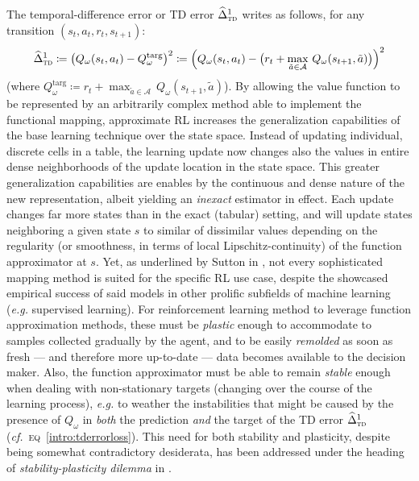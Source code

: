 The temporal-difference error or TD error $\widehat{\Delta}_\textsc{td}^1$
writes as follows, for any transition $(s_t,a_t,r_t,s_{t+1})$:
\begin{align}
\widehat{\Delta}_\textsc{td}^1
\coloneqq
\big(
Q_\omega(s_t,a_t) - Q_\omega^\text{targ}
\big)^2
\coloneqq
\Big(
Q_\omega(s_t,a_t) - \big(r_t + \max_{\tilde{a} \in \mathcal{A}} \, Q_\omega(s_{t+1},\tilde{a})\big)
\Big)^2
\label{intro:tderrorloss}
\end{align}
\big(where
$Q_\omega^\text{targ} \coloneqq r_t + \max_{\tilde{a} \in \mathcal{A}} \, Q_\omega(s_{t+1},\tilde{a})$\big).
By allowing the value function to be represented by an arbitrarily complex method able to implement the
functional mapping, approximate RL increases the generalization capabilities of the base learning technique over
the state space. Instead of updating individual, discrete cells in a table, the learning update now changes
also the values in entire dense neighborhoods of the update location in the state space.
This greater generalization capabilities are enables by the continuous and dense nature of the new representation,
albeit yielding an \emph{inexact} estimator in effect. Each update changes far more states than in the exact (tabular)
setting, and will update states neighboring a given state $s$ to similar of dissimilar values
depending on the regularity (or smoothness, in terms of local Lipschitz-continuity) of the function approximator at $s$.
Yet, as underlined by Sutton in \cite{Sutton1998-ow}, not every sophisticated mapping method is suited
for the specific RL use case, despite the showcased empirical success of said models in
other prolific subfields of machine learning (\textit{e.g.} supervised learning).
For reinforcement learning method to leverage function approximation methods,
these must be \emph{plastic} enough to accommodate to samples collected gradually by the agent,
and to be easily \emph{remolded} as soon as fresh --- and therefore more up-to-date --- data becomes
available to the decision maker.
Also, the function approximator must be able to remain \emph{stable} enough when dealing with non-stationary targets
(changing over the course of the learning process), \textit{e.g.}
to weather the instabilities that might be caused by the presence of $Q_\omega$
in \emph{both} the prediction \emph{and}
the target of the TD error $\widehat{\Delta}_\textsc{td}^1$
(\textit{cf.}~\textsc{eq}~\ref{intro:tderrorloss}).
This need for both stability and plasticity, despite being somewhat contradictory desiderata,
has been addressed under the heading of \emph{stability-plasticity dilemma} in \cite{Carpenter1987-wd}.
